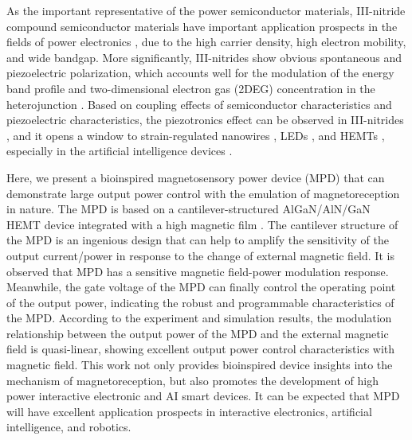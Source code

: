 As the important representative of the power semiconductor materials, III-nitride  compound semiconductor materials have important application prospects in the fields of power electronics \cite{ueda2019gan}, due to the high carrier density, high electron  mobility, and wide bandgap. More significantly, III-nitrides show obvious spontaneous  and  piezoelectric polarization, which accounts well for the modulation  of the energy band  profile and two-dimensional electron gas (2DEG) concentration  in the heterojunction \cite{ambacher2000two,jena2010polarization,yu1999spontaneous}. Based on coupling effects of semiconductor characteristics and piezoelectric characteristics, the piezotronics  effect can be observed in III-nitrides \cite{pan2019piezotronics,wang2018piezotronics,sha2019iii}, and it opens a window to strain-regulated nanowires \cite{wang2016piezotronic,wang2006piezoelectric}, LEDs \cite{huang2016piezo,liu2020piezo,guo2021enhanced}, and HEMTs \cite{jiang2017piezotronic,wang2016piezotronic,hua2021piezotronics}, especially in the artificial intelligence devices \cite{hua2021piezotronics,johnsen2005physics}.

Here, we present a bioinspired magnetosensory power device (MPD) that can demonstrate large output power  control with the emulation of magnetoreception in nature. The MPD is based on a  cantilever-structured AlGaN/AlN/GaN HEMT  device integrated with a high magnetic  film . The cantilever  structure of the MPD is an ingenious design that can help to amplify the sensitivity of the output current/power in response to the change of external magnetic  field. It is observed that MPD has a sensitive magnetic field-power modulation response. Meanwhile, the gate voltage  of the MPD can finally control the operating point of the  output power, indicating the robust and programmable characteristics of the MPD. According to the experiment and simulation results, the modulation  relationship between the output power of the MPD and the external  magnetic field is quasi-linear, showing excellent output power control characteristics with magnetic field. This work not only provides bioinspired device insights into the mechanism of magnetoreception, but also promotes the development of high power interactive electronic and AI smart devices. It can be expected that MPD will have excellent application prospects in interactive electronics, artificial intelligence, and robotics.

